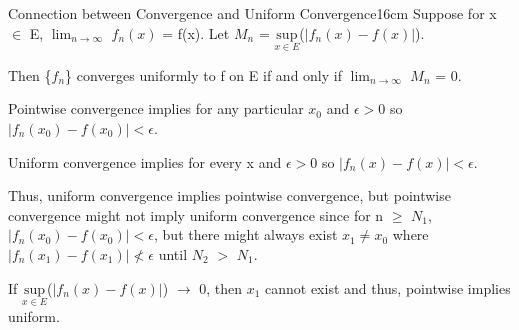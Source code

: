     \newpage



    \begin{wtheorem}{Connection between Convergence and Uniform Convergence}{16cm}
        Suppose for x $\in$ E, $\lim_{n \rightarrow \infty}$ $f_n(x)$ = f(x).
        Let $M_n$ = $\underset{x \in E}{\text{sup}}$($|f_n(x) - f(x)|$).

        Then \{$f_n$\} converges uniformly to f on E if and only if
        $\lim_{n \rightarrow \infty}$ $M_n$ = 0.        
    \end{wtheorem}

    \begin{intuition}
        Pointwise convergence implies for any particular $x_0$ and $\epsilon > 0$
        so $|f_n(x_0) - f(x_0)| < \epsilon$.

        Uniform convergence implies for every x and $\epsilon > 0$
        so $|f_n(x) - f(x)| < \epsilon$.

        \vspace{0.2cm}

        Thus, uniform convergence implies pointwise convergence, but pointwise
        convergence might not imply uniform convergence since for n $\geq$ $N_1$,
        $|f_n(x_0) - f(x_0)| < \epsilon$, but there might always exist
        $x_1 \not = x_0$ where $|f_n(x_1) - f(x_1)| \not < \epsilon$
        until $N_2$ $>$ $N_1$.

        If $\underset{x \in E}{\text{sup}}$($|f_n(x) - f(x)|$) $\rightarrow$ 0,
        then $x_1$ cannot exist and thus, pointwise implies uniform.
    \end{intuition}
    
    \vspace{0.1cm}

